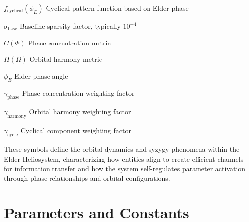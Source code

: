 \begin{multicols}{2}
\noindent$f_{\text{cyclical}}(\phi_E)$ \dotfill Cyclical pattern function based on Elder phase

\noindent$\sigma_{\text{base}}$ \dotfill Baseline sparsity factor, typically $10^{-4}$

\noindent$C(\Phi)$ \dotfill Phase concentration metric 

\noindent$H(\Omega)$ \dotfill Orbital harmony metric

\noindent$\phi_E$ \dotfill Elder phase angle

\noindent$\gamma_{\text{phase}}$ \dotfill Phase concentration weighting factor

\noindent$\gamma_{\text{harmony}}$ \dotfill Orbital harmony weighting factor

\noindent$\gamma_{\text{cycle}}$ \dotfill Cyclical component weighting factor

\end{multicols}

\vspace{1cm}
\begin{center}
These symbols define the orbital dynamics and syzygy phenomena within the Elder Heliosystem, characterizing how entities align to create efficient channels for information transfer and how the system self-regulates parameter activation through phase relationships and orbital configurations.
\end{center}

\clearpage
\chapter*{Parameters and Constants}

